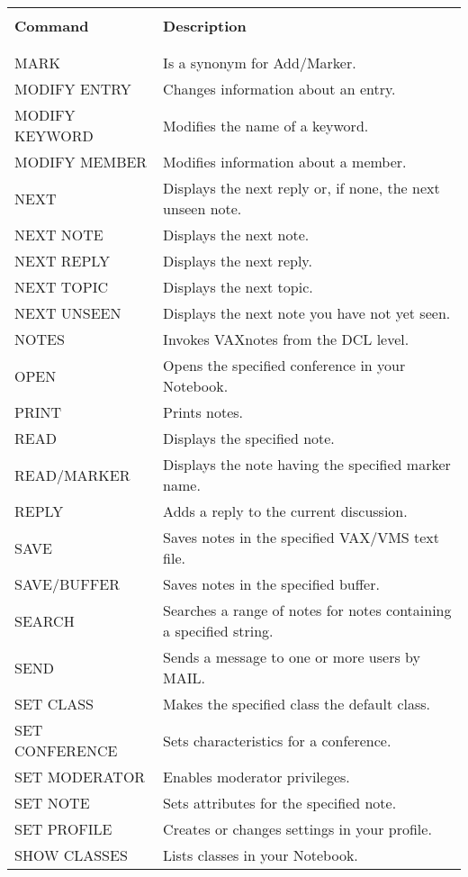 \begin{tabular}{ l l }
& \\
\hline
& \\
{\large \bf Command}  & {\large \bf Description} \\
& \\
\hline
& \\
MARK			& Is a synonym for Add/Marker.\\
MODIFY ENTRY		& Changes information about an entry.\\
MODIFY KEYWORD		& Modifies the name of a keyword.\\
MODIFY MEMBER		& Modifies information about a member.\\
NEXT			& Displays the next reply or, if none, the next unseen note.\\
NEXT NOTE		& Displays the next note.\\
NEXT REPLY		& Displays the next reply.\\
NEXT TOPIC		& Displays the next topic.\\
NEXT UNSEEN		& Displays the next note you have not yet seen.\\
NOTES			& Invokes VAXnotes from the DCL level.\\
OPEN			& Opens the specified conference in your Notebook.\\
PRINT			& Prints notes.\\
READ 			& Displays the specified note.\\
READ/MARKER		& Displays the note having the specified marker name.\\
REPLY			& Adds a reply to the current discussion.\\
SAVE			& Saves notes in the specified VAX/VMS text file.\\
SAVE/BUFFER		& Saves notes in the specified buffer.\\
SEARCH			& Searches a range of notes for notes containing a specified string.\\
SEND			& Sends a message to one or more users by MAIL.\\
SET CLASS		& Makes the specified class the default class.\\
SET CONFERENCE		& Sets characteristics for a conference.\\
SET MODERATOR		& Enables moderator privileges.\\
SET NOTE		& Sets attributes for the specified note.\\
SET PROFILE		& Creates or changes settings in your profile.\\
SHOW CLASSES		& Lists classes in your Notebook.\\

\end{tabular}
